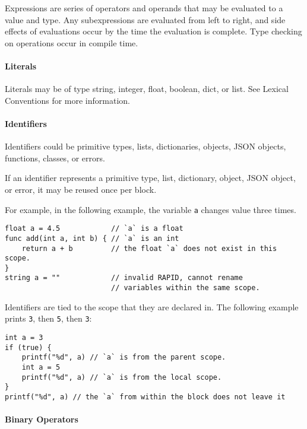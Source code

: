 \documentclass[]{article}
\begin{document}
Expressions are series of operators and operands that may be evaluated
to a value and type. Any subexpressions are evaluated from left to
right, and side effects of evaluations occur by the time the evaluation
is complete. Type checking on operations occur in compile time.

\paragraph{Literals}\label{literals-1}

Literals may be of type string, integer, float, boolean, dict, or list.
See Lexical Conventions for more information.

\paragraph{Identifiers}\label{identifiers-1}

Identifiers could be primitive types, lists, dictionaries, objects, JSON
objects, functions, classes, or errors.

If an identifier represents a primitive type, list, dictionary, object,
JSON object, or error, it may be reused once per block.

For example, in the following example, the variable \texttt{a} changes
value three times.

\begin{verbatim}
float a = 4.5            // `a` is a float
func add(int a, int b) { // `a` is an int 
    return a + b         // the float `a` does not exist in this scope.
} 
string a = ""            // invalid RAPID, cannot rename 
                         // variables within the same scope.
\end{verbatim}

Identifiers are tied to the scope that they are declared in. The
following example prints \texttt{3}, then \texttt{5}, then \texttt{3}:

\begin{verbatim}
int a = 3
if (true) {
    printf("%d", a) // `a` is from the parent scope.
    int a = 5
    printf("%d", a) // `a` is from the local scope.
}
printf("%d", a) // the `a` from within the block does not leave it
\end{verbatim}

\paragraph{Binary Operators}\label{binary-operators}
\end{document}
